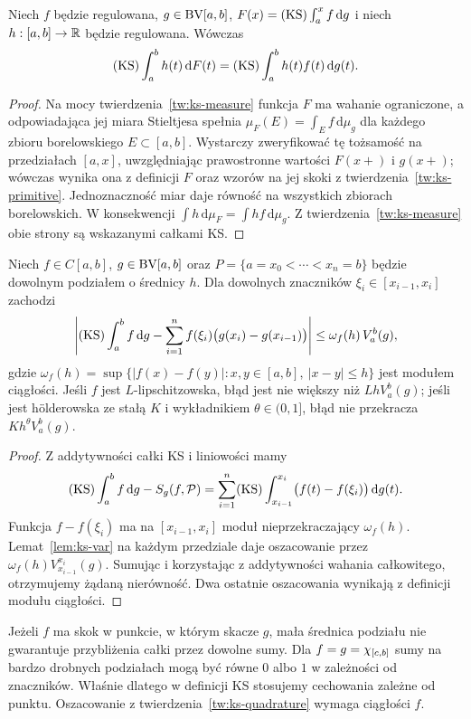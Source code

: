 \begin{twierdzenie}
\label{tw:ks-chain}
Niech $f$ będzie regulowana, $g\in\mathrm{BV}[a,b]$, $F(x)=(\mathrm{KS})\int_a^x f\,\mathrm dg$ i niech $h:[a,b]\to\mathbb R$ będzie regulowana. Wówczas
\[
 (\mathrm{KS})\int_a^b h(t)\,\mathrm dF(t)
 =(\mathrm{KS})\int_a^b h(t)f(t)\,\mathrm dg(t).
\]
\end{twierdzenie}
\begin{proof}
Na mocy twierdzenia~\ref{tw:ks-measure} funkcja $F$ ma wahanie ograniczone, a odpowiadająca jej miara Stieltjesa spełnia $\mu_F(E)=\int_E f\,\mathrm d\mu_g$ dla każdego zbioru borelowskiego $E\subset[a,b]$. Wystarczy zweryfikować tę tożsamość na przedziałach $[a,x]$, uwzględniając prawostronne wartości $F(x+)$ i $g(x+)$; wówczas wynika ona z definicji $F$ oraz wzorów na jej skoki z twierdzenia~\ref{tw:ks-primitive}. Jednoznaczność miar daje równość na wszystkich zbiorach borelowskich. W konsekwencji $\int h\,\mathrm d\mu_F=\int hf\,\mathrm d\mu_g$. Z twierdzenia~\ref{tw:ks-measure} obie strony są wskazanymi całkami KS.
\end{proof}

\begin{twierdzenie}
\label{tw:ks-quadrature}
Niech $f\in C[a,b]$, $g\in\mathrm{BV}[a,b]$ oraz $P=\{a=x_0<\cdots<x_n=b\}$ będzie dowolnym podziałem o średnicy $h$. Dla dowolnych znaczników $\xi_i\in[x_{i-1},x_i]$ zachodzi
\[
 \left|(\mathrm{KS})\int_a^b f\,\mathrm dg-
 \sum_{i=1}^n f(\xi_i)\bigl(g(x_i)-g(x_{i-1})\bigr)\right|
 \le\omega_f(h)\,V_a^b(g),
\]
gdzie $\omega_f(h)=\sup\{|f(x)-f(y)|:x,y\in[a,b],\ |x-y|\le h\}$ jest modułem ciągłości. Jeśli $f$ jest $L$-lipschitzowska, błąd jest nie większy niż $LhV_a^b(g)$; jeśli jest h\"olderowska ze stałą $K$ i wykładnikiem $\theta\in(0,1]$, błąd nie przekracza $Kh^\theta V_a^b(g)$.
\end{twierdzenie}
\begin{proof}
Z addytywności całki KS i liniowości mamy
\[
 (\mathrm{KS})\int_a^b f\,\mathrm dg-S_g(f,\mathcal P)
 =\sum_{i=1}^n(\mathrm{KS})\int_{x_{i-1}}^{x_i}\bigl(f(t)-f(\xi_i)\bigr)\,\mathrm dg(t).
\]
Funkcja $f-f(\xi_i)$ ma na $[x_{i-1},x_i]$ moduł nieprzekraczający $\omega_f(h)$. Lemat~\ref{lem:ks-var} na każdym przedziale daje oszacowanie przez $\omega_f(h)V_{x_{i-1}}^{x_i}(g)$. Sumując i korzystając z addytywności wahania całkowitego, otrzymujemy żądaną nierówność. Dwa ostatnie oszacowania wynikają z definicji modułu ciągłości.
\end{proof}

\begin{uwaga}
Jeżeli $f$ ma skok w punkcie, w którym skacze $g$, mała średnica podziału nie gwarantuje przybliżenia całki przez dowolne sumy. Dla $f=g=\chi_{[c,b]}$ sumy na bardzo drobnych podziałach mogą być równe $0$ albo $1$ w zależności od znaczników. Właśnie dlatego w definicji KS stosujemy cechowania zależne od punktu. Oszacowanie z twierdzenia~\ref{tw:ks-quadrature} wymaga ciągłości $f$.
\end{uwaga}

